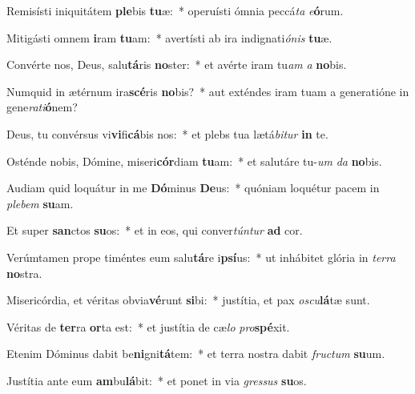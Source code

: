 \item Remisísti iniquitátem \textbf{ple}bis \textbf{tu}æ:~* operuísti ómnia peccá\textit{ta} \textit{e}\textbf{ó}rum.
\item Mitigásti omnem \textbf{i}ram \textbf{tu}am:~* avertísti ab ira indignati\textit{ónis} \textbf{tu}æ.
\item Convérte nos, Deus, salu\textbf{tá}ris \textbf{no}ster:~* et avérte iram tu\hspace{0.03em}\textit{am} \textit{a} \textbf{no}bis.
\item Numquid in ætérnum ira\textbf{scé}ris \textbf{no}bis?~* aut exténdes iram tuam a generatióne in gene\textit{rati}\textbf{ó}nem?
\item Deus, tu convérsus vi\textbf{vi}fi\textbf{cá}bis nos:~* et plebs tua lætá\textit{bitur} \textbf{in} te.
\item Osténde nobis, Dómine, miseri\textbf{cór}diam \textbf{tu}am:~* et salutáre tu-\hspace{0.03em}\textit{um} \textit{da} \textbf{no}bis.
\item Audiam quid loquátur in me \textbf{Dó}minus \textbf{De}us:~* quóniam loquétur pacem in \textit{plebem} \textbf{su}am.
\item Et super \textbf{san}ctos \textbf{su}os:~* et in eos, qui conver\textit{túntur} \textbf{ad} cor.
\item Verúmtamen prope timéntes eum salu\textbf{tá}re i\textbf{psí}us:~* ut inhábitet glória in \textit{terra} \textbf{no}stra.
\item Misericórdia, et véritas obvia\textbf{vé}runt \textbf{si}bi:~* justítia, et pax \textit{oscu}\textbf{lá}tæ sunt.
\item Véritas de \textbf{ter}ra \textbf{or}ta est:~* et justítia de cæ\textit{lo} \textit{pro}\textbf{spé}xit.
\item Etenim Dóminus dabit be\textbf{ni}gni\textbf{tá}tem:~* et terra nostra dabit \textit{fructum} \textbf{su}um.
\item Justítia ante eum \textbf{am}bu\textbf{lá}bit:~* et ponet in via \textit{gressus} \textbf{su}os.
